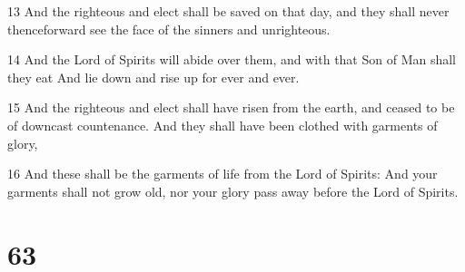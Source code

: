 \par 13 And the righteous and elect shall be saved on that day, and they shall never thenceforward see the face of the sinners and unrighteous.
\par 14 And the Lord of Spirits will abide over them, and with that Son of Man shall they eat And lie down and rise up for ever and ever.
\par 15 And the righteous and elect shall have risen from the earth, and ceased to be of downcast countenance. And they shall have been clothed with garments of glory,
\par 16 And these shall be the garments of life from the Lord of Spirits: And your garments shall not grow old, nor your glory pass away before the Lord of Spirits.

\chapter{63}

